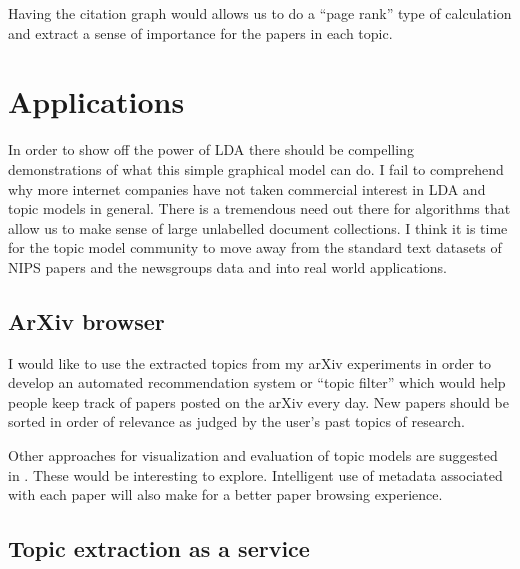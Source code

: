 \documentclass[letterpaper,11pt]{article}
\begin{document}
        Having the citation graph would allows us to do a ``page rank'' type of calculation
        and extract a sense of importance for the papers in each topic.




\section{Applications}

	In order to show off the power of LDA there should be compelling demonstrations of 
	what this simple graphical model can do.
	I fail to comprehend why more internet companies have not taken commercial interest in 
	LDA and topic models in general.
	There is a tremendous need out there for algorithms that allow us to make sense of large 
	unlabelled document collections.
	I think it is time for the topic model community to move away from the standard text
	datasets of NIPS papers and the newsgroups data and into real world applications.
	
	
	\subsection{ArXiv browser}
	
	    I would like to use the extracted topics from my arXiv experiments in order to develop an automated
	    recommendation system or  ``topic filter'' which would help people keep track of papers
	    posted on the arXiv every day.
	    New papers should be sorted in order of relevance as judged by the user's past topics of research.

	   Other approaches for visualization and evaluation of topic models are suggested in 
	    \cite{boyd2009reading}. These would be interesting to explore.
	   Intelligent use of metadata associated with each paper will also make for a better 
	   paper browsing experience.
	   
	   
	\subsection{Topic extraction as a service}
	
\end{document}
